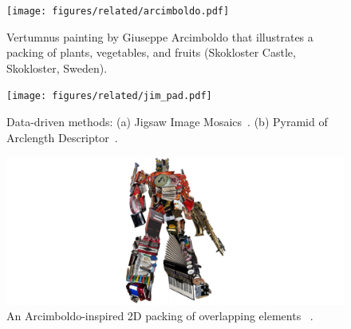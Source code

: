 
\begin{figure}
\centering
\texttt{[image: figures/related/arcimboldo.pdf]} 
\caption[Vertumnus painting by Giuseppe Arcimboldo]
{\label{fig_related_arcimboldo} 
\nnewtext
{
Vertumnus painting by Giuseppe Arcimboldo that illustrates
a packing of plants, vegetables, and fruits
(Skokloster Castle, Skokloster, Sweden). 
}
}
\end{figure}

\begin{figure}
\centering
\texttt{[image: figures/related/jim\_pad.pdf]} 
\caption[Packings generated by JIM and PAD]
{\label{fig_related_jim_pad} 
\newtext
{
Data-driven methods:
(a) Jigsaw Image Mosaics~\cite{Kim2002}.
(b) Pyramid of Arclength Descriptor~\cite{Kwan2016}. 
}
}
\end{figure}




\begin{figure}
\centering
\includegraphics[width=1.0\textwidth]{figures/related/optimus.pdf} 
\caption[An Arcimboldo-inspired 2D packing]
{\label{fig_related_optimus} 
\nnewtext
{
An Arcimboldo-inspired 2D packing of overlapping elements~\cite{Huang2011} .
}
}
\end{figure}

